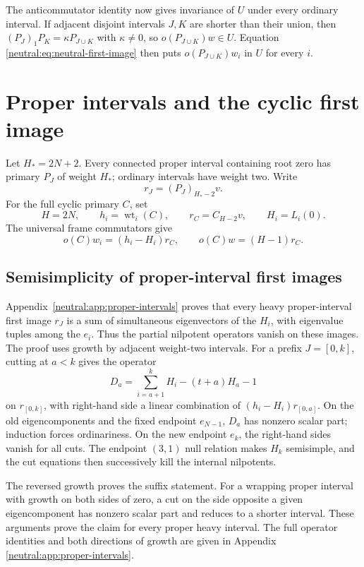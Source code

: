 \documentclass[11pt,a4paper]{article}
\numberwithin{equation}{section}
\theoremstyle{definition}\newtheorem{definition}[theorem]{Definition}
\theoremstyle{remark}\newtheorem{remark}[theorem]{Remark}
\newcommand{\wt}{\operatorname{wt}}\newcommand{\loc}{\mathrm{loc}}
\begin{document}
The anticommutator identity now gives invariance of $U$ under every
ordinary interval.  If adjacent disjoint intervals $J,K$ are shorter
than their union, then
$(P_J)_1P_K=\kappa P_{J\cup K}$ with $\kappa\ne0$, so
$o(P_{J\cup K})w\in U$.  Equation
\eqref{neutral:eq:neutral-first-image} then puts
$o(P_{J\cup K})w_i$ in $U$ for every $i$.



\section{Proper intervals and the cyclic first image}
\label{r:sec:cyclic}

Let \(H_*=2N+2\). Every connected proper interval containing root
zero has primary \(P_J\) of weight \(H_*\); ordinary intervals have
weight two. Write
\[
                   r_J=(P_J)_{H_*-2}v.
\]
For the full cyclic primary \(C\), set
\[
      H=2N,\qquad h_i=\wt_i(C),\qquad
      r_C=C_{H-2}v,\qquad H_i=L_i(0).
\]
The universal frame commutators give
\begin{equation}\label{r:eq:Cwi}
        o(C)w_i=(h_i-H_i)r_C,\qquad
        o(C)w=(H-1)r_C.
\end{equation}

\subsection{Semisimplicity of proper-interval first images}

Appendix~\ref{neutral:app:proper-intervals} proves that every heavy
proper-interval first image \(r_J\) is a sum of simultaneous
eigenvectors of the \(H_i\), with eigenvalue tuples among the \(e_i\).
Thus the partial nilpotent operators vanish on these images.
The proof uses growth by adjacent weight-two intervals.
For a prefix \(J=[0,k]\), cutting at \(a<k\) gives the operator
\[
        D_a=\sum_{i=a+1}^kH_i-(t+a)H_a-1
\]
on \(r_{[0,k]}\), with right-hand side a linear combination of
\((h_i-H_i)r_{[0,a]}\). On the old eigencomponents and the fixed
endpoint \(e_{N-1}\), \(D_a\) has nonzero scalar part; induction forces
ordinariness. On the new endpoint \(e_k\), the right-hand sides
vanish for all cuts. The endpoint \((3,1)\) null relation makes
\(H_k\) semisimple, and the cut equations then successively kill
the internal nilpotents.

The reversed growth proves the suffix statement. For a wrapping
proper interval with growth on both sides of zero, a cut on the
side opposite a given eigencomponent has nonzero scalar part
and reduces to a shorter interval. These arguments prove the
claim for every proper heavy interval. The full operator identities and both directions of growth are given
in Appendix \ref{neutral:app:proper-intervals}.
\end{document}
